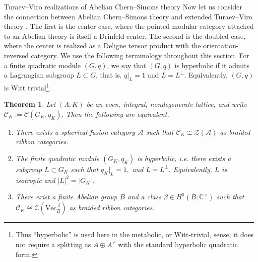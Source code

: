 \documentclass[12pt]{amsart}
\makeatletter
\renewcommand\section{\@startsection{section}{1}%
  \z@{.7\linespacing\@plus\linespacing}{.5\linespacing}%
  {\normalfont\bfseries\centering}}
\numberwithin{equation}{section}
\newtheorem{theorem}{Theorem}[section]
\theoremstyle{definition}
\newcommand{\VecCat}{\mathrm{Vec}}
\makeatother
\begin{document}
\section{Turaev–Viro realizations of Abelian Chern--Simons theory}
\label{sec:tv}
Now let us consider the connection between Abelian Chern--Simons theory and extended Turaev--Viro theory \cite{TV92,BW96,Balsam10,TV2017}.  The first is the center case, where the pointed modular category attached to an Abelian theory is itself a Drinfeld center.  The second is the doubled case, where the center is realized as a Deligne tensor product with the orientation-reversed category. We use the following terminology throughout this section. For a finite quadratic module $(G,q)$, we say that $(G,q)$ is hyperbolic if it admits a Lagrangian subgroup $L\subset G$, that is, $q|_L=1$ and $L=L^\perp$. Equivalently, $(G,q)$ is Witt trivial\footnote{Thus ``hyperbolic'' is used here in the metabolic, or Witt-trivial, sense; it does not require a splitting as $A\oplus A^\vee$ with the standard hyperbolic quadratic form.}.

\begin{theorem}
\label{thm:center-criterion}
Let $(\Lambda,K)$ be an even, integral, nondegenerate lattice, and write $\mathcal C_K:=\mathcal C(G_K,q_K).$ Then the following are equivalent.

\begin{enumerate}[label=\rm(\alph*)]
\item There exists a spherical fusion category $\mathcal A$ such that $\mathcal C_K \cong \mathcal Z(\mathcal A)$ as braided ribbon categories.

\item The finite quadratic module $(G_K,q_K)$ is hyperbolic, i.e. there exists a
subgroup $L\subset G_K$ such that $q_K|_L=1,
$ and $ L=L^\perp .$
Equivalently, $L$ is isotropic and $|L|^2=|G_K|$.

\item There exist a finite Abelian group $B$ and a class
$\beta\in H^3(B;\mathbb C^\times)$ such that $\mathcal C_K \cong \mathcal Z(\VecCat_B^{\,\beta})$ as braided ribbon categories.
\end{enumerate}
\end{theorem}
\end{document}
